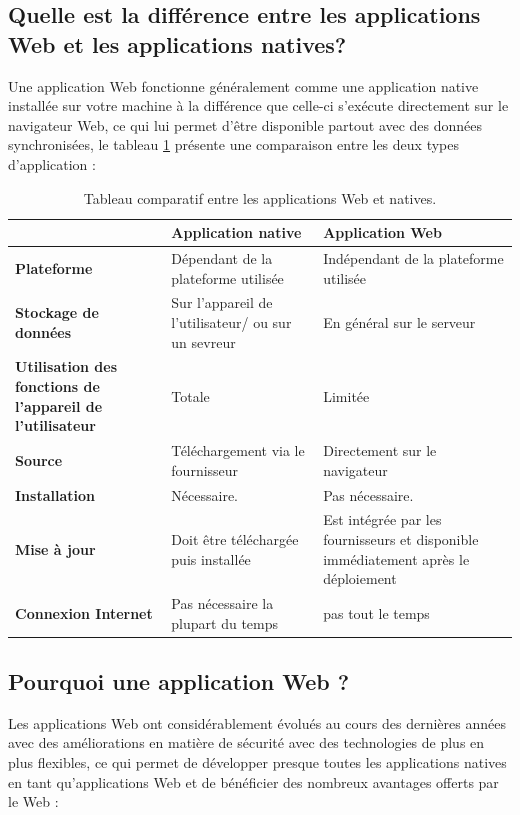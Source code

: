 \subsection{Quelle est la différence entre les applications Web et les applications natives?}
Une application Web fonctionne généralement comme une application native
installée sur votre machine à la différence que celle-ci s’exécute directement
sur le navigateur Web, ce qui lui permet d’être disponible partout avec des
données synchronisées, le tableau \ref{tab1} présente une
comparaison entre les deux types d’application \cite{1} :
 \clearpage       
\begin{table}[!h]
  \small
  \centering
  \footnotesize{
   \begin{tabular}{|p{4cm}|p{4cm}|p{4cm}|} %
    \hline
      & \textbf{Application native} & \textbf{Application Web} \\
    \hline
   \textbf{Plateforme} & Dépendant de la plateforme utilisée & Indépendant de la plateforme utilisée \\
    \hline
    \textbf{Stockage de données} & Sur l’appareil de l’utilisateur/ ou sur un sevreur & En général sur le serveur \\
    \hline
    \textbf{Utilisation des fonctions de l’appareil de l’utilisateur} & Totale & Limitée \\
    \hline
    \textbf{Source} & Téléchargement via le fournisseur & Directement sur le navigateur \\
    \hline
    \textbf{Installation} & Nécessaire. & Pas nécessaire. \\
    \hline
    \textbf{Mise à jour} & Doit être téléchargée puis installée & Est intégrée par les fournisseurs et disponible immédiatement après le déploiement \\
    \hline
    \textbf{Connexion Internet} & Pas nécessaire la plupart du temps & pas tout le temps \\
    \hline
    \end{tabular}}
    \caption{Tableau comparatif entre les applications Web et natives.} 
    \label{tab1}
\end{table}
    
\subsection{Pourquoi une application Web ?}
Les applications Web ont considérablement évolués au cours des dernières années
avec des améliorations en matière de sécurité avec des technologies de plus en
plus flexibles, ce qui permet de développer presque toutes les applications
natives en tant qu’applications Web et de bénéficier des nombreux avantages
offerts par le Web \cite{2} :
        
